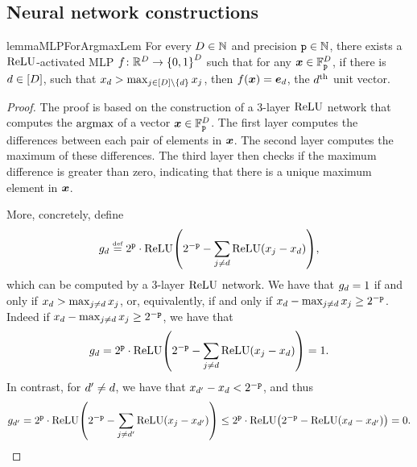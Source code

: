 \subsection{Neural network constructions}
\begin{restatable}{lemma}{MLPForArgmaxLem} \label{lem:mlp-for-argmax}
   For every ${{D}} \in {{\mathbb{N}}}$ and precision ${{\texttt{p}}} \in {{\mathbb{N}}}$, there exists a ${{\mathrm{ReLU}}}$-activated MLP ${{{f}}}\colon {{\mathbb{R}}}^{{D}} \to {\left\{ 0, 1 \right\}}^{{D}}$ such that for any ${{{\bm{x}}}} \in {{\mathbb{F}}}^{{{D}}}_{{\texttt{p}}}$, if there is ${{d}} \in {\left[ {{D}}\right]}$, such that ${{{x}}}_d > \max_{j \in {\left[ {{D}}\right]} \setminus {\left\{ {{d}}\right\}}} {{{x}}}_{j}$, then ${{{f}}}({{{\bm{x}}}}) = {{{\bm{e}}}}_d$, the ${{d}}\textsuperscript{th}$ unit vector.
\end{restatable}
\begin{proof}
   The proof is based on the construction of a 3-layer ${{\mathrm{ReLU}}}$ network that computes the $\operatorname*{{{argmax}}}$ of a vector ${{{\bm{x}}}} \in {{\mathbb{F}}}^{{{D}}}_{{\texttt{p}}}$.
   The first layer computes the differences between each pair of elements in ${{{\bm{x}}}}$.
   The second layer computes the maximum of these differences.
   The third layer then checks if the maximum difference is greater than zero, indicating that there is a unique maximum element in ${{{\bm{x}}}}$.
   
   More, concretely, define 
   \begin{equation}
      g_\dimidx \defeq 2^\numPrec \cdot \ReLUFun{2^{-\numPrec} - \sum_{j \neq \dimidx} \ReLU(\evx_j - \evx_\dimidx)}, 
   \end{equation}
   which can be computed by a 3-layer ${{\mathrm{ReLU}}}$ network.
   We have that $g_{{d}} = 1$ if and only if ${{{x}}}_{{d}} > \max_{j \neq {{d}}} {{{x}}}_j$, or, equivalently, if and only if ${{{x}}}_{{d}} - \max_{j \neq {{d}}} {{{x}}}_j \geq 2^{-{{\texttt{p}}}}$.
   Indeed if ${{{x}}}_{{d}} - \max_{j \neq {{d}}} {{{x}}}_j \geq 2^{-{{\texttt{p}}}}$, we have that 
   \begin{equation}
      g_\dimidx = 2^\numPrec \cdot \ReLUFun{2^{-\numPrec} - \sum_{j \neq \dimidx} \ReLU(\evx_j - \evx_\dimidx)} = 1.
   \end{equation}
   In contrast, for ${{d}}' \neq {{d}}$, we have that ${{{x}}}_{{{d}}'} - {{{x}}}_{{d}} < 2^{-{{\texttt{p}}}}$, and thus
   \begin{equation}
      g_{\dimidx'} = 2^\numPrec \cdot \ReLUFun{2^{-\numPrec} - \sum_{j \neq \dimidx'} \ReLU(\evx_j - \evx_{\dimidx'})} \leq 2^\numPrec \cdot \ReLUFun{2^{-\numPrec} - \ReLU(\evx_{\dimidx} - \evx_{\dimidx'})} = 0.
   \end{equation}
\end{proof}


